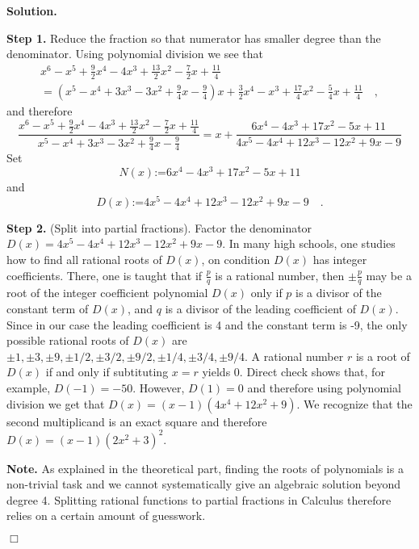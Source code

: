 \documentclass[12pt]{book}
\newcommand{\eqdef}{\textbf{:=}}
\newenvironment{solution}{\textbf{Solution.} }{$\Box$}
\begin{document}
\begin{solution}

\noindent\textbf{Step 1.} Reduce the fraction so that numerator has smaller degree than the denominator. Using polynomial division we see that 
\[
\begin{array}{l}
x^{6}-x^{5}+\frac{9}{2} x^{4}-4 x^{3}+\frac{13}{2} x^{2}-\frac{7}{2} x + \frac{11}{4} \\ = (x^{5}-x^{4}+3 x^{3}-3 x^{2} + \frac{9}{4} x-\frac{9}{4}) x +\frac{3}{2} x^{4}-x^{3} +\frac{17}{4} x^{2}-\frac{5}{4} x +\frac{11}{4}\quad ,
\end{array}
\]
and therefore 
\[ 
\frac{x^{6}-x^{5}+\frac{9}{2} x^{4}-4 x^{3}+\frac{13}{2} x^{2}-\frac{7}{2} x+\frac{11}{4}}{x^{5}-x^{4}+3 x^{3}-3 x^{2}+\frac{9}{4} x-\frac{9}{4}} = x+\frac{6 x^{4}-4 x^{3}+17 x^{2}-5 x+11}{4x^{5}-4 x^{4}+12 x^{3}-12 x^{2}+9 x-9}
\]
Set 
\[
N(x)\eqdef 6 x^{4}-4 x^{3}+17 x^{2}-5 x+11
\]
and 
\[
D(x)\eqdef 4x^{5}-4 x^{4}+12 x^{3}-12 x^{2}+9 x-9\quad .
\]

\noindent\textbf{Step 2.} (Split into partial fractions). Factor the denominator $D(x)=4x^{5}-4 x^{4}+12 x^{3}-12 x^{2}+9 x-9$. In many high schools, one studies how to find all rational roots of $D(x)$, on condition $D(x)$ has integer coefficients. There, one is taught that if $\frac{p}{q}$ is a rational number, then $\pm \frac{p}{q}$ may be a root of the integer coefficient polynomial $D(x)$ only if $p$ is a divisor of the constant term of $D(x)$, and $q$ is a divisor of the leading coefficient of $D(x)$. Since in our case the leading coefficient is 4 and the constant term is -9, the only possible rational roots of $D(x)$ are $\pm 1, \pm 3, \pm 9, \pm 1/2, \pm 3/2, \pm 9/2, \pm 1/4, \pm 3/4, \pm 9/4$. A rational number $r$ is a root of $D(x)$ if and only if subtituting $x=r$ yields 0. Direct check shows that, for example,  $D(-1)=-50$. However, $D(1)=0$ and therefore using polynomial division we get that $D(x)=(x-1)(4x^{4}+12x^{2}+9)$. We recognize that the second multiplicand is an exact square and therefore $D(x)=(x-1)(2x^2+3)^2$.

\textbf{Note.} As explained in the theoretical part, finding the roots of polynomials is a non-trivial task and we cannot systematically give an algebraic solution beyond degree 4. Splitting rational functions to partial fractions in Calculus therefore relies on a certain amount of guesswork.


\end{solution}
\end{document}
